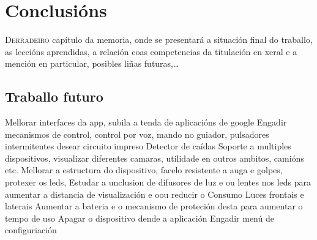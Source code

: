 \chapter{Conclusións}
\label{chap:conclusions}

\lettrine{D}{erradeiro} capítulo da memoria, onde se presentará a
situación final do traballo, as leccións aprendidas, a relación coas
competencias da titulación en xeral e a mención en particular,
posibles liñas futuras,\dots
\section{Traballo futuro}
Mellorar interfaces da app, subila a tenda de aplicacións de google
Engadir mecanismos de control, control por voz, mando no guiador, pulsadores intermitentes
desear circuito impreso
Detector de caídas
Soporte a multiples dispositivos, visualizar diferentes camaras, utilidade en outros ambitos, camións etc.
Mellorar a estructura do dispositivo, facelo resistente a auga e golpes, protexer os leds,
Estudar a unclusion de difusores de luz e ou lentes nos leds para aumentar a distancia de visualización e oou reducir o Consumo
Luces frontais e laterais
Aumentar a bateria e o mecanismo de proteción desta para aumentar o tempo de uso
Apagar o dispositivo dende a aplicación
Engadir menú de configuriación
